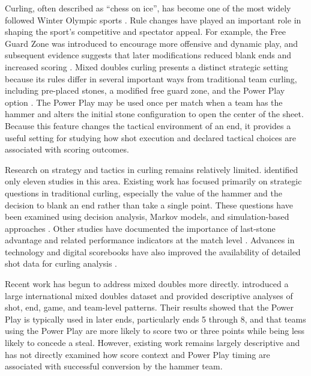 \documentclass[titlepage, 12pt]{article}
\begin{document}
Curling, often described as ``chess on ice'', has become one of the most widely
followed Winter Olympic sports \citep{agduman2023review}. Rule changes have
played an important role in shaping the sport's competitive and spectator
appeal. For example, the Free Guard Zone was introduced to encourage more
offensive and dynamic play, and subsequent evidence suggests that later
modifications reduced blank ends and increased scoring
\citep{agduman2023review,agduman2023impact}. Mixed doubles curling presents a
distinct strategic setting because its rules differ in several important ways
from traditional team curling, including pre-placed stones, a modified free
guard zone, and the Power Play option \citep{worldcurlingrules2025}. The Power
Play may be used once per match when a team has the hammer and alters the
initial stone configuration to open the center of the sheet. Because this
feature changes the tactical environment of an end, it provides a useful
setting for studying how shot execution and declared tactical choices are
associated with scoring outcomes.

Research on strategy and tactics in curling remains relatively limited.
\citet{zacharias2024examination} identified only eleven studies in this area.
Existing work has focused primarily on strategic questions in traditional
curling, especially the value of the hammer and the decision to blank an end
rather than take a single point. These questions have been examined using
decision analysis, Markov models, and simulation-based approaches
\citep{kostuk2006paradox,willoughby2005analysis, clement2012analysis,
        brenzel2019analysis, fry2024elementary}. Other studies have documented the
importance of last-stone advantage and related performance indicators at the
match level \citep{park2013analysis,erhan2023exploring}. Advances in technology
and digital scorebooks have also improved the availability of detailed shot
data for curling analysis \citep{masui2016informatics}.

Recent work has begun to address mixed doubles more directly.
\citet{ritchie2025opening} introduced a large international mixed doubles
dataset and provided descriptive analyses of shot, end, game, and team-level
patterns. Their results showed that the Power Play is typically used in later
ends, particularly ends 5 through 8, and that teams using the Power Play are
more likely to score two or three points while being less likely to concede a
steal. However, existing work remains largely descriptive and has not directly
examined how score context and Power Play timing are associated with successful
conversion by the hammer team.
\end{document}
